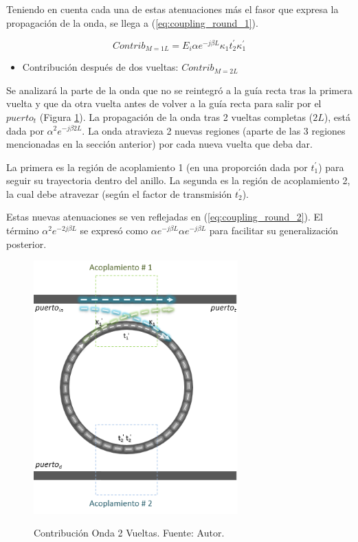 Teniendo en cuenta cada una de estas atenuaciones más el fasor que expresa la propagación
de la onda, se llega a (\ref{eq:coupling_round_1}).

\begin{equation}
Contrib_{M=1L} = E_i \alpha e^{-j \beta L} \kappa_1 t_2^{'} \kappa_1^{'}
\label{eq:coupling_round_1}
\end{equation} 

\begin{itemize}
\item Contribución después de dos vueltas: $Contrib_{M=2L}$
\end{itemize} 

Se analizará la parte de la onda que no se reintegró a la guía recta tras la primera vuelta
y que da otra vuelta antes de volver a la guía recta para salir por el $puerto_t$
(Figura \ref{fig:rr_n2}).
La propagación de la onda tras 2 vueltas completas ($2L$), está dada por 
$\alpha^2 e^{-j \beta 2L}$.
La onda atravieza 2 nuevas regiones (aparte de las 3 regiones mencionadas en la sección anterior)
por cada nueva vuelta que deba dar. 

La primera es la región de acoplamiento 1 (en una proporción dada por $t_1^{'}$) 
para seguir su trayectoria dentro del anillo.
La segunda es la región de acoplamiento 2, la cual debe atravezar (según el factor de 
transmisión $t_2^{'}$).

Estas nuevas atenuaciones se ven reflejadas en (\ref{eq:coupling_round_2}). 
El término $\alpha^2 e^{-2j \beta L}$ se expresó como
 $\alpha e^{-j \beta L} \alpha e^{-j \beta L}$ para facilitar
su generalización posterior.

\begin{figure}[h!]
\caption{Contribución Onda 2 Vueltas. Fuente: Autor.}
\centering
\includegraphics[width=0.7\textwidth,natwidth=397,natheight=493]{figs/rr_n2.PNG}
\label{fig:rr_n2}
\end{figure} 


